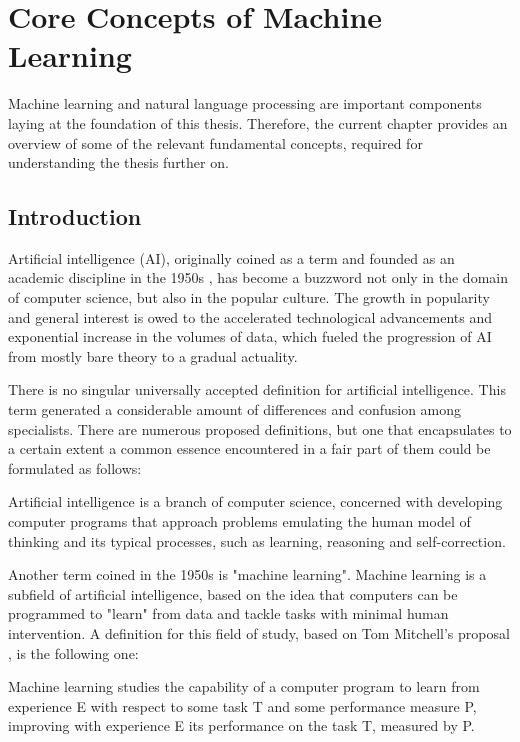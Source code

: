 \section{Core Concepts of Machine Learning}
Machine learning and natural language processing are important components laying at the foundation of this thesis. Therefore, the current chapter provides an overview of some of the relevant fundamental concepts, required for understanding the thesis further on.

\subsection{Introduction}

Artificial intelligence (AI), originally coined as a term and founded as an academic discipline in the 1950s \cite{a5}, has become a buzzword not only in the domain of computer science, but also in the popular culture. The growth in popularity and general interest is owed to the accelerated technological advancements and exponential increase in the volumes of data, which fueled the progression of AI from mostly bare theory to a gradual actuality.

There is no singular universally accepted definition for artificial intelligence. This term generated a considerable amount of differences and confusion among specialists\cite{a6}. There are numerous proposed definitions, but one that encapsulates to a certain extent a common essence encountered in a fair part of them could be formulated as follows:

\begin{definition}
  Artificial intelligence is a branch of computer science, concerned with developing computer programs that approach problems emulating the human model of thinking and its typical processes, such as learning, reasoning and self-correction.
\end{definition}

Another term coined in the 1950s is "machine learning". Machine learning is a subfield of artificial intelligence, based on the idea that computers can be programmed to "learn" from data and tackle tasks with minimal human intervention. A definition for this field of study, based on Tom Mitchell's proposal \cite{b1}, is the following one:

\begin{definition}
  Machine learning studies the capability of a computer program to learn from experience E with respect to some task T and some performance measure P, improving with experience E its performance on the task T, measured by P.
\end{definition}

